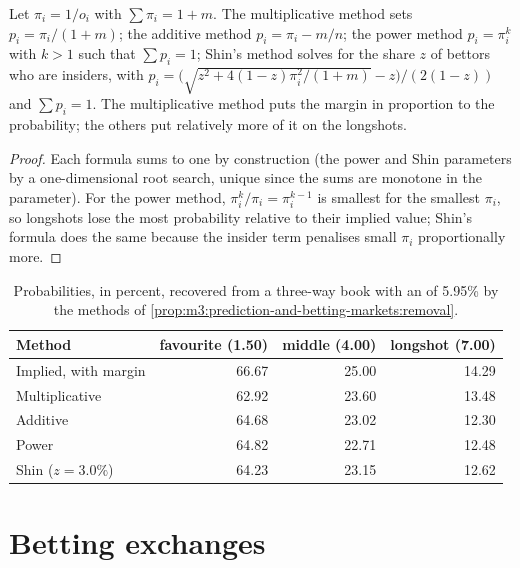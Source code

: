 \begin{proposition}\label{prop:m3:prediction-and-betting-markets:removal}
Let $\pi_i = 1/o_i$ with $\sum \pi_i = 1 + m$. The multiplicative method sets $p_i = \pi_i/(1 + m)$; the additive method $p_i = \pi_i -
m/n$; the power method $p_i = \pi_i^k$ with $k > 1$ such that $\sum p_i = 1$; Shin's method solves for the share $z$ of bettors who are
insiders, with $p_i = \big(\sqrt{z^2 + 4(1 - z)\pi_i^2/(1 + m)} - z\big)/(2(1 - z))$ and $\sum p_i = 1$. The multiplicative method puts the
margin in proportion to the probability; the others put relatively more of it on the longshots.
\end{proposition}

\begin{proof}
Each formula sums to one by construction (the power and Shin parameters by a one-dimensional root search, unique since the sums are
monotone in the parameter). For the power method, $\pi_i^k/\pi_i = \pi_i^{k - 1}$ is smallest for the smallest $\pi_i$, so longshots
lose the most probability relative to their implied value; Shin's formula does the same because the insider term penalises small
$\pi_i$ proportionally more.
\end{proof}

\begin{table}[ht]
\centering
\small
\begin{tabular}{@{}lrrr@{}}
\toprule
Method & favourite (1.50) & middle (4.00) & longshot (7.00) \\
\midrule
Implied, with margin & 66.67 & 25.00 & 14.29 \\
Multiplicative & 62.92 & 23.60 & 13.48 \\
Additive & 64.68 & 23.02 & 12.30 \\
Power & 64.82 & 22.71 & 12.48 \\
Shin ($z = 3.0\%$) & 64.23 & 23.15 & 12.62 \\
\bottomrule
\end{tabular}
\caption{Probabilities, in percent, recovered from a three-way book with an  of 5.95\% by the methods of
\cref{prop:m3:prediction-and-betting-markets:removal}.}\label{tab:m3:prediction-and-betting-markets:methods}
\end{table}

\section{Betting exchanges}

